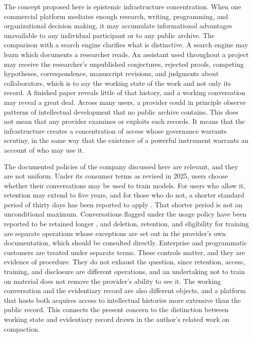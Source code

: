 \documentclass[12pt]{article}
\theoremstyle{definition}
\theoremstyle{remark}
\begin{document}
The concept proposed here is epistemic infrastructure concentration. When one commercial platform mediates enough research, writing, programming, and organizational decision making, it may accumulate informational advantages unavailable to any individual participant or to any public archive. The comparison with a search engine clarifies what is distinctive. A search engine may learn which documents a researcher reads. An assistant used throughout a project may receive the researcher's unpublished conjectures, rejected proofs, competing hypotheses, correspondence, manuscript revisions, and judgments about collaborators, which is to say the working state of the work and not only its record. A finished paper reveals little of that history, and a working conversation may reveal a great deal. Across many users, a provider could in principle observe patterns of intellectual development that no public archive contains. This does not mean that any provider examines or exploits such records. It means that the infrastructure creates a concentration of access whose governance warrants scrutiny, in the same way that the existence of a powerful instrument warrants an account of who may use it.

The documented policies of the company discussed here are relevant, and they are not uniform. Under its consumer terms as revised in 2025, users choose whether their conversations may be used to train models. For users who allow it, retention may extend to five years, and for those who do not, a shorter standard period of thirty days has been reported to apply \cite{anthropicterms2025,anthropicretention,bitdefender2025}. That shorter period is not an unconditional maximum. Conversations flagged under the usage policy have been reported to be retained longer \cite{ooda2025}, and deletion, retention, and eligibility for training are separate operations whose exceptions are set out in the provider's own documentation, which should be consulted directly. Enterprise and programmatic customers are treated under separate terms. These controls matter, and they are evidence of procedure. They do not exhaust the question, since retention, access, training, and disclosure are different operations, and an undertaking not to train on material does not remove the provider's ability to see it. The working conversation and the evidentiary record are also different objects, and a platform that hosts both acquires access to intellectual histories more extensive than the public record. This connects the present concern to the distinction between working state and evidentiary record drawn in the author's related work on compaction.
\end{document}
